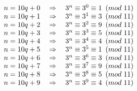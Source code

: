 \documentclass{article}
\begin{document}
	\begin{center}
		$n = 10q + 0 \quad \Rightarrow \quad 3^n \equiv 3^0 \equiv 1 \hspace{5px} (mod \hspace{3px} 11) $ \\
		$n = 10q + 1 \quad \Rightarrow \quad 3^n \equiv 3^1 \equiv 3 \hspace{5px} (mod \hspace{3px} 11) $ \\
		$n = 10q + 2 \quad \Rightarrow \quad 3^n \equiv 3^2 \equiv 9 \hspace{5px} (mod \hspace{3px} 11) $ \\
		$n = 10q + 3 \quad \Rightarrow \quad 3^n \equiv 3^3 \equiv 5 \hspace{5px} (mod \hspace{3px} 11) $ \\
		$n = 10q + 4 \quad \Rightarrow \quad 3^n \equiv 3^4 \equiv 4 \hspace{5px} (mod \hspace{3px} 11) $ \\
		$n = 10q + 5 \quad \Rightarrow \quad 3^n \equiv 3^5 \equiv 1 \hspace{5px} (mod \hspace{3px} 11) $ \\
		$n = 10q + 6 \quad \Rightarrow \quad 3^n \equiv 3^6 \equiv 3 \hspace{5px} (mod \hspace{3px} 11) $ \\
		$n = 10q + 7 \quad \Rightarrow \quad 3^n \equiv 3^7 \equiv 9 \hspace{5px} (mod \hspace{3px} 11) $ \\
		$n = 10q + 8 \quad \Rightarrow \quad 3^n \equiv 3^8 \equiv 5 \hspace{5px} (mod \hspace{3px} 11) $ \\
		$n = 10q + 9 \quad \Rightarrow \quad 3^n \equiv 3^9 \equiv 4 \hspace{5px} (mod \hspace{3px} 11) $ \\
	\end{center}
	\vspace{10px}
	
\end{document}
